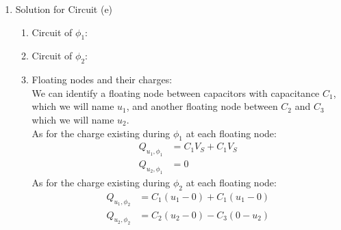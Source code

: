 {\begin{enumerate}
{\begin{enumerate}
{                }
            \end{enumerate}
        }
        \item {
            Solution for Circuit (e) \\
            \begin{center}
                
            \end{center}
            \begin{enumerate}
                \item[1.] {
                    Circuit of $\phi_1$:
                    \begin{center}
                        
                    \end{center}
                }
                \item[2.] {
                    Circuit of $\phi_2$:
                    \begin{center}
                        
                    \end{center}
                }
                \item[3.] {
                    Floating nodes and their charges: \\
                    We can identify a floating node between capacitors with capacitance $C_1$, which we will name $u_1$, and another floating node between $C_2$ and $C_3$ which we will name $u_2$. \\
                    As for the charge existing during $\phi_1$ at each floating node:
                    \begin{align*}
                        Q_{u_1, \phi_1} &= C_1 V_S + C_1 V_S \\
                        Q_{u_2, \phi_1} &= 0
                    \end{align*}
                    As for the charge existing during $\phi_2$ at each floating node:
                    \begin{align*}
                        Q_{u_1, \phi_2} &= C_1 (u_1 - 0) + C_1 (u_1 - 0) \\
                        Q_{u_2, \phi_2} &= C_2 (u_2 - 0) - C_3 (0 - u_2)
                    \end{align*}
                    
}
\end{enumerate}}
\end{enumerate}}
